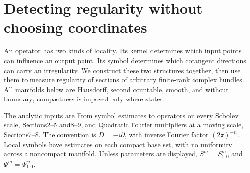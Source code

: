 \documentclass[
  11pt,
]{article}
\author{}
\date{}
\begin{document}
\section{Detecting regularity without choosing
coordinates}\label{detecting-regularity-without-choosing-coordinates}

An operator has two kinds of locality. Its kernel determines which input
points can influence an output point. Its symbol determines which
cotangent directions can carry an irregularity. We construct these two
structures together, then use them to measure regularity of sections of
arbitrary finite-rank complex bundles. All manifolds below are
Hausdorff, second countable, smooth, and without boundary; compactness
is imposed only where stated.

The analytic inputs are \href{euclidean-symbol-calculus.pdf}{From symbol
estimates to operators on every Sobolev scale}, Sections2--5 and8--9,
and \href{gauss-transform-estimates.pdf}{Quadratic Fourier multipliers at
a moving scale}, Sections7--8. The convention is \(D=-i\partial\), with
inverse Fourier factor \((2\pi)^{-n}\). Local symbols have estimates on
each compact base set, with no uniformity across a noncompact manifold.
Unless parameters are displayed, \(S^m=S^m_{1,0}\) and
\(\Psi^m=\Psi^m_{1,0}\).
\end{document}
